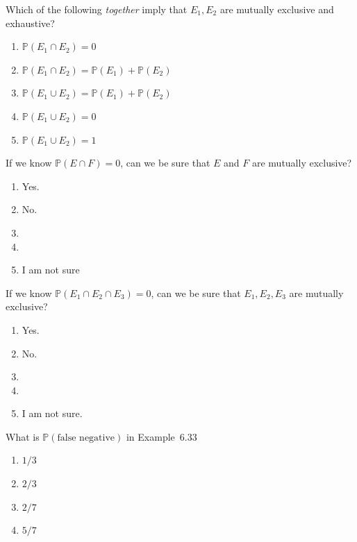 \documentclass[aspectratio=169, t, 14pt]{beamer}
\begin{document}
\begin{poll}
  Which of the following \emph{together} imply that \(E_{1},E_{2}\) are mutually exclusive and exhaustive?

  \begin{enumerate}
    \item \(\mathbb{P}(E_{1} \cap E_{2}) = 0\)
    \item \(\mathbb{P}(E_{1} \cap E_{2}) = \mathbb{P}(E_{1}) + \mathbb{P}(E_{2})\)
    \item \(\mathbb{P}(E_{1} \cup E_{2}) = \mathbb{P}(E_{1}) + \mathbb{P}(E_{2})\)
    \item \(\mathbb{P}(E_{1} \cup E_{2}) = 0\)
    \item \(\mathbb{P}(E_{1} \cup E_{2}) = 1\)
  \end{enumerate}
\end{poll}

\begin{frame}
  If we know \(\mathbb{P}(E \cap F) = 0\), can we be sure that \(E\) and \(F\) are mutually exclusive?

\begin{enumerate}
    \item Yes.
    \item No.
    \item 
    \item 
    \item I am not sure
  \end{enumerate}
\end{frame}

\begin{poll}
  If we know \(\mathbb{P}(E_{1} \cap E_{2} \cap E_{3}) = 0\), can we be sure that \(E_{1}, E_{2}, E_{3}\) are mutually exclusive?

  \begin{enumerate}
    \item Yes.
    \item No.
    \item 
    \item 
    \item I am not sure.
  \end{enumerate}
\end{poll}

\begin{poll}
  What is \(\mathbb{P}(\text{false negative})\) in Example~6.33

  \begin{enumerate}
    \item \(1/3\)
    \item \(2/3\)
    \item \(2/7\)
    \item \(5/7\)
  \end{enumerate}
\end{poll}
\end{document}
